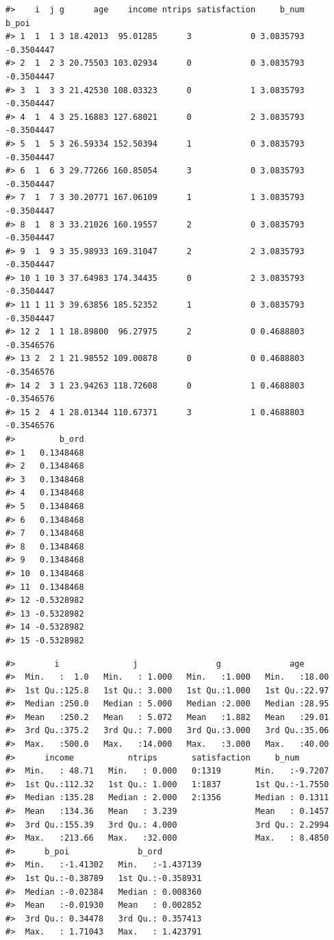 \begin{verbatim}
#>    i  j g      age    income ntrips satisfaction     b_num      b_poi
#> 1  1  1 3 18.42013  95.01285      3            0 3.0835793 -0.3504447
#> 2  1  2 3 20.75503 103.02934      0            0 3.0835793 -0.3504447
#> 3  1  3 3 21.42530 108.03323      0            1 3.0835793 -0.3504447
#> 4  1  4 3 25.16883 127.68021      0            2 3.0835793 -0.3504447
#> 5  1  5 3 26.59334 152.50394      1            0 3.0835793 -0.3504447
#> 6  1  6 3 29.77266 160.85054      3            0 3.0835793 -0.3504447
#> 7  1  7 3 30.20771 167.06109      1            1 3.0835793 -0.3504447
#> 8  1  8 3 33.21026 160.19557      2            0 3.0835793 -0.3504447
#> 9  1  9 3 35.98933 169.31047      2            2 3.0835793 -0.3504447
#> 10 1 10 3 37.64983 174.34435      0            2 3.0835793 -0.3504447
#> 11 1 11 3 39.63856 185.52352      1            0 3.0835793 -0.3504447
#> 12 2  1 1 18.89800  96.27975      2            0 0.4688803 -0.3546576
#> 13 2  2 1 21.98552 109.00878      0            0 0.4688803 -0.3546576
#> 14 2  3 1 23.94263 118.72608      0            1 0.4688803 -0.3546576
#> 15 2  4 1 28.01344 110.67371      3            1 0.4688803 -0.3546576
#>         b_ord
#> 1   0.1348468
#> 2   0.1348468
#> 3   0.1348468
#> 4   0.1348468
#> 5   0.1348468
#> 6   0.1348468
#> 7   0.1348468
#> 8   0.1348468
#> 9   0.1348468
#> 10  0.1348468
#> 11  0.1348468
#> 12 -0.5328982
#> 13 -0.5328982
#> 14 -0.5328982
#> 15 -0.5328982
\end{verbatim}

\begin{verbatim}
#>        i               j                g              age       
#>  Min.   :  1.0   Min.   : 1.000   Min.   :1.000   Min.   :18.00  
#>  1st Qu.:125.8   1st Qu.: 3.000   1st Qu.:1.000   1st Qu.:22.97  
#>  Median :250.0   Median : 5.000   Median :2.000   Median :28.95  
#>  Mean   :250.2   Mean   : 5.072   Mean   :1.882   Mean   :29.01  
#>  3rd Qu.:375.2   3rd Qu.: 7.000   3rd Qu.:3.000   3rd Qu.:35.06  
#>  Max.   :500.0   Max.   :14.000   Max.   :3.000   Max.   :40.00  
#>      income           ntrips       satisfaction     b_num        
#>  Min.   : 48.71   Min.   : 0.000   0:1319       Min.   :-9.7207  
#>  1st Qu.:112.32   1st Qu.: 1.000   1:1837       1st Qu.:-1.7550  
#>  Median :135.28   Median : 2.000   2:1356       Median : 0.1311  
#>  Mean   :134.36   Mean   : 3.239                Mean   : 0.1457  
#>  3rd Qu.:155.39   3rd Qu.: 4.000                3rd Qu.: 2.2994  
#>  Max.   :213.66   Max.   :32.000                Max.   : 8.4850  
#>      b_poi              b_ord          
#>  Min.   :-1.41302   Min.   :-1.437139  
#>  1st Qu.:-0.38789   1st Qu.:-0.358931  
#>  Median :-0.02384   Median : 0.008360  
#>  Mean   :-0.01930   Mean   : 0.002852  
#>  3rd Qu.: 0.34478   3rd Qu.: 0.357413  
#>  Max.   : 1.71043   Max.   : 1.423791
\end{verbatim}

